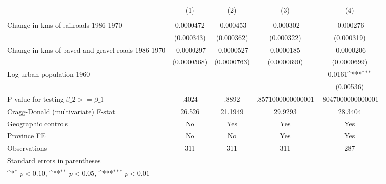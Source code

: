 {
\def\sym#1{\ifmmode^{#1}\else\(^{#1}\)\fi}
\begin{tabular}{l*{4}{c}}
\hline\hline
                &\multicolumn{1}{c}{(1)}&\multicolumn{1}{c}{(2)}&\multicolumn{1}{c}{(3)}&\multicolumn{1}{c}{(4)}\\
                &\multicolumn{1}{c}{}&\multicolumn{1}{c}{}&\multicolumn{1}{c}{}&\multicolumn{1}{c}{}\\
\hline
Change in kms of railroads 1986-1970&0.0000472         &-0.000453         &-0.000302         &-0.000276         \\
                &(0.000343)         &(0.000362)         &(0.000322)         &(0.000319)         \\
[1em]
Change in kms of paved and gravel roads 1986-1970&-0.0000297         &-0.0000527         &0.0000185         &-0.0000206         \\
                &(0.0000568)         &(0.0000763)         &(0.0000690)         &(0.0000699)         \\
[1em]
Log urban population 1960&                  &                  &                  &   0.0161\sym{***}\\
                &                  &                  &                  &(0.00536)         \\
\hline
P-value for testing $\beta\_{2} >= \beta\_{1}$&    .4024         &    .8892         &.8571000000000001         &.8047000000000001         \\
Cragg-Donald (multivariate) F-stat&   26.526         &  21.1949         &  29.9293         &  28.3404         \\
Geographic controls&       No         &      Yes         &      Yes         &      Yes         \\
Province FE     &       No         &       No         &      Yes         &      Yes         \\
Observations    &      311         &      311         &      311         &      287         \\
\hline\hline
\multicolumn{5}{l}{\footnotesize Standard errors in parentheses}\\
\multicolumn{5}{l}{\footnotesize \sym{*} \(p<0.10\), \sym{**} \(p<0.05\), \sym{***} \(p<0.01\)}\\
\end{tabular}
}
